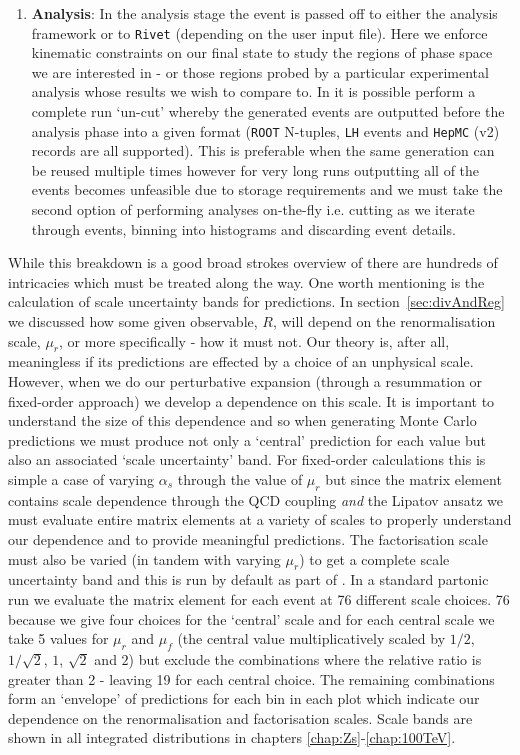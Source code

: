 \begin{enumerate}
			\item \textbf{Analysis}: In the analysis stage the event is passed off to either
			the \HEJ analysis framework or to \texttt{Rivet} (depending on the user input file).
			Here we enforce kinematic constraints on our final state to study the regions of
			phase space we are interested in - or those regions probed by a particular
			experimental analysis whose results we wish to compare to.  In \HEJ it is possible
			perform a complete run `un-cut' whereby the generated events are outputted before
			the analysis phase into a given format (\texttt{ROOT} N-tuples, \texttt{LH} events
			and \texttt{HepMC} (v2) records are all supported).  This is preferable when the same
			generation can be reused multiple times however for very long runs outputting all of the
			events becomes unfeasible due to storage requirements and we must take the second option
			of performing \HEJ analyses on-the-fly i.e. cutting as we iterate through events, binning
			into histograms and discarding event details.
		\end{enumerate}

		While this breakdown is a good broad strokes overview of \HEJ there are hundreds of intricacies
		which must be treated along the way.  One worth mentioning is the calculation of scale uncertainty
		bands for predictions.  In section~\eqref{sec:divAndReg} we discussed how some given observable, $R$,
		will depend on the renormalisation scale, $\mu_r$, or more specifically - how it must not.  Our theory
		is, after all, meaningless if its predictions are effected by a choice of an unphysical scale.  However,
		when we do our perturbative expansion (through a resummation or fixed-order approach) we develop a
		dependence on this scale.  It is important to understand the size of this dependence and so when
		generating Monte Carlo predictions we must produce not only a `central' prediction for each value but
		also an associated `scale uncertainty' band.  For fixed-order calculations this is simple a case of
		varying $\alpha_s$ through the value of $\mu_r$ but since the \hej matrix element contains scale
		dependence through the QCD coupling \emph{and} the Lipatov ansatz we must evaluate entire matrix elements
		at a variety of scales to properly understand our dependence and to provide meaningful predictions.  The
		factorisation scale must also be varied (in tandem with varying $\mu_r$) to get a complete
		scale uncertainty band and this is run by default as part of \HEJ.  In a standard partonic \HEJ
		run we evaluate the matrix element for each event at 76 different scale choices.  76
		because we give four choices for the `central' scale and for each central scale we take 5
		values for $\mu_r$ and $\mu_f$ (the central value multiplicatively scaled by $1/2$, $1/\sqrt{2}$,
		$1$, $\sqrt{2}$ and $2$) but exclude the combinations where the relative ratio is greater
		than 2 - leaving 19 for each central choice.  The remaining combinations form an `envelope' of
		predictions for each bin in each plot which indicate our dependence on the renormalisation and
		factorisation scales.  Scale bands are shown in all integrated distributions in chapters
		\ref{chap:Zs}-\ref{chap:100TeV}.

